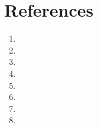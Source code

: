 \chapter*{References}
\begin{enumerate}
    \item 
     \item 
      \item 
       \item 
        \item 
         \item 
          \item 
           \item 
    
\end{enumerate}